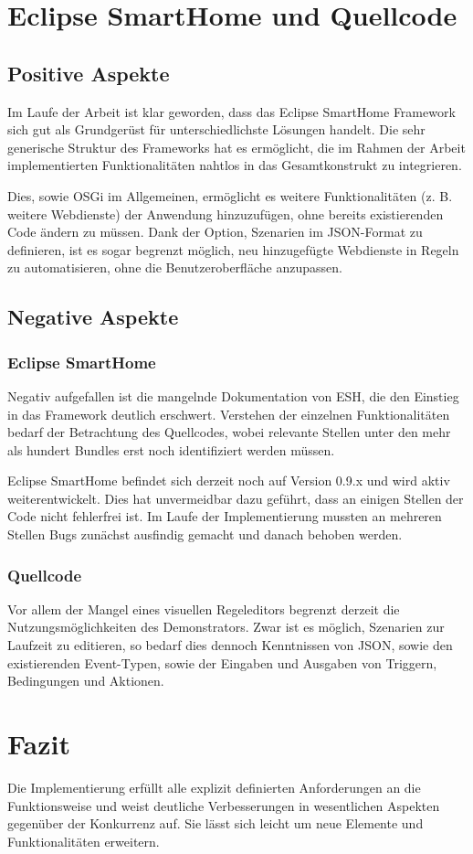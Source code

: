 \section{Eclipse SmartHome und Quellcode}
\subsection{Positive Aspekte}
Im Laufe der Arbeit ist klar geworden, dass das Eclipse SmartHome Framework sich gut als Grundgerüst für unterschiedlichste Lösungen handelt. Die sehr generische Struktur des Frameworks hat es ermöglicht, die im Rahmen der Arbeit implementierten Funktionalitäten nahtlos in das Gesamtkonstrukt zu integrieren. 

Dies, sowie OSGi im Allgemeinen, ermöglicht es weitere Funktionalitäten (z. B. weitere Webdienste) der Anwendung hinzuzufügen, ohne bereits existierenden Code ändern zu müssen. Dank der Option, Szenarien im JSON-Format zu definieren, ist es sogar begrenzt möglich, neu hinzugefügte Webdienste in Regeln zu automatisieren, ohne die Benutzeroberfläche anzupassen.

\subsection{Negative Aspekte}
\subsubsection{Eclipse SmartHome}
Negativ aufgefallen ist die mangelnde Dokumentation von ESH, die den Einstieg in das Framework deutlich erschwert. Verstehen der einzelnen Funktionalitäten bedarf der Betrachtung des Quellcodes, wobei relevante Stellen unter den mehr als hundert Bundles erst noch identifiziert werden müssen. 

Eclipse SmartHome befindet sich derzeit noch auf Version 0.9.x und wird aktiv weiterentwickelt. Dies hat unvermeidbar dazu geführt, dass an einigen Stellen der Code nicht fehlerfrei ist. Im Laufe der Implementierung mussten an mehreren Stellen Bugs zunächst ausfindig gemacht und danach behoben werden.

\subsubsection{Quellcode}
Vor allem der Mangel eines visuellen Regeleditors begrenzt derzeit die Nutzungsmöglichkeiten des Demonstrators. Zwar ist es möglich, Szenarien zur Laufzeit zu editieren, so bedarf dies dennoch Kenntnissen von JSON, sowie den existierenden Event-Typen, sowie der Eingaben und Ausgaben von Triggern, Bedingungen und Aktionen.

\section{Fazit}
Die Implementierung erfüllt alle explizit definierten Anforderungen an die Funktionsweise und weist deutliche Verbesserungen in wesentlichen Aspekten gegenüber der Konkurrenz auf. Sie lässt sich leicht um neue Elemente und Funktionalitäten erweitern.

